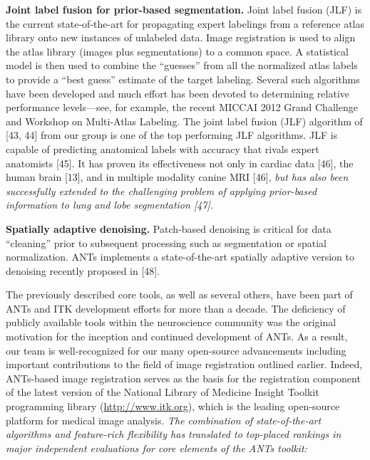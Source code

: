 \documentclass[11pt,]{article}
\begin{document}
\textbf{Joint label fusion for prior-based segmentation.} Joint label
fusion (JLF) is the current state-of-the-art for propagating expert
labelings from a reference atlas library onto new instances of unlabeled
data. Image registration is used to align the atlas library (images plus
segmentations) to a common space. A statistical model is then used to
combine the ``guesses'' from all the normalized atlas labels to provide
a ``best guess'' estimate of the target labeling. Several such
algorithms have been developed and much effort has been devoted to
determining relative performance levels---see, for example, the recent
MICCAI 2012 Grand Challenge and Workshop on Multi-Atlas Labeling. The
joint label fusion (JLF) algorithm of {[}43, 44{]} from our group is one
of the top performing JLF algorithms. JLF is capable of predicting
anatomical labels with accuracy that rivals expert anatomists {[}45{]}.
It has proven its effectiveness not only in cardiac data {[}46{]}, the
human brain {[}13{]}, and in multiple modality canine MRI {[}46{]},
\emph{but has also been successfully extended to the challenging problem
of applying prior-based information to lung and lobe segmentation
{[}47{]}.}

\textbf{Spatially adaptive denoising.} Patch-based denoising is critical
for data ``cleaning'' prior to subsequent processing such as
segmentation or spatial normalization. ANTs implements a
state-of-the-art spatially adaptive version to denoising recently
proposed in {[}48{]}.

The previously described core tools, as well as several others, have
been part of ANTs and ITK development efforts for more than a decade.
The deficiency of publicly available tools within the neuroscience
community was the original motivation for the inception and continued
development of ANTs. As a result, our team is well-recognized for our
many open-source advancements including important contributions to the
field of image registration outlined earlier. Indeed, ANTs-based image
registration serves as the basis for the registration component of the
latest version of the National Library of Medicine Insight Toolkit
programming library (\url{http://www.itk.org}), which is the leading
open-source platform for medical image analysis. \emph{The combination
of state-of-the-art algorithms and feature-rich flexibility has
translated to top-placed rankings in major independent evaluations for
core elements of the ANTs toolkit:}
\end{document}

